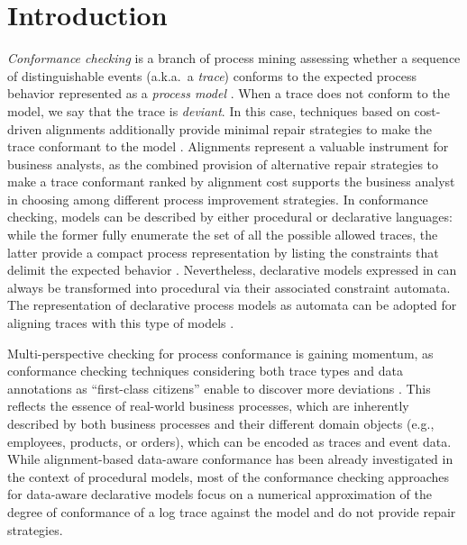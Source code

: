 \section{Introduction}
\label{sec:introduction}

\textit{Conformance checking} is a branch of process mining  assessing whether a sequence of distinguishable events (a.k.a.\ a \textit{trace}) conforms to the expected process behavior represented as a \textit{process model} \cite{RozinatA08}. When a trace does not conform to the model, we say that the trace is \textit{deviant}. In this case, techniques based on cost-driven alignments additionally provide minimal repair strategies to make the trace conformant to the model \cite{LeoniA13}. Alignments represent a valuable instrument for business analysts, as the combined provision of alternative repair strategies to make a trace conformant ranked by alignment cost supports the business analyst in choosing among different process improvement strategies. In conformance checking, models can be described by either procedural or declarative languages: while the former fully enumerate the set of all the possible allowed traces, the latter provide a compact process representation by listing the constraints that delimit the expected behavior \cite{LeoniA13,Westergaard11}. Nevertheless,  declarative models expressed in  can always be transformed into procedural via their associated constraint automata. 
The representation of declarative process models as automata can be adopted for aligning traces with this type of models \cite{LeoniMA12,XuLZ17a}.


Multi-perspective checking for process conformance is gaining momentum, as conformance checking techniques considering both trace types and data annotations as ``first-class citizens'' enable to discover more deviations \cite{MultiPerspective}. This reflects the essence of real-world business processes, which are inherently described by both business processes and their different domain objects \cite{PetermannJMR14} (e.g., employees, products, or orders), which can be encoded as traces and event data. While alignment-based  data-aware conformance has been already investigated in the context of procedural models, most of the conformance checking approaches for data-aware declarative models \cite{BurattinMS16,Borrego014} focus on a numerical approximation of the degree of conformance of a log trace against the model and do not provide repair strategies.

